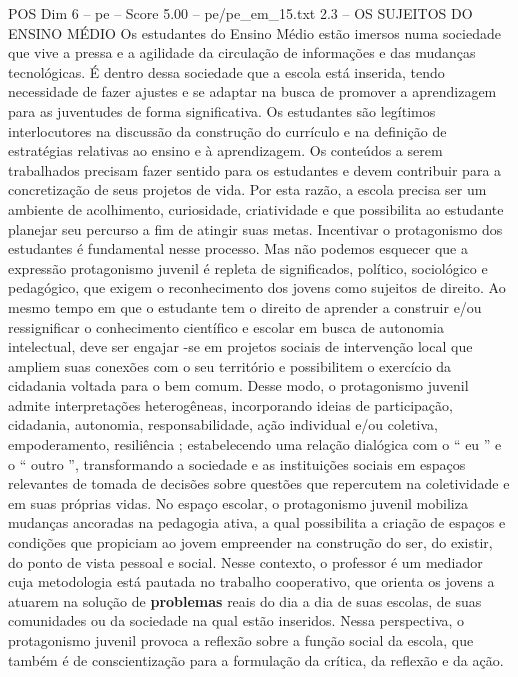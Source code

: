 \begin{textsample}{POS Dim 6 – pe – Score 5.00 – pe/pe\_em\_15.txt}  \label{ex:f6_pos_260}
2.3 – OS SUJEITOS DO ENSINO MÉDIO Os estudantes do Ensino Médio estão imersos numa sociedade que vive a pressa e a agilidade da circulação de informações e das mudanças tecnológicas.
É dentro dessa sociedade que a escola está inserida, tendo necessidade de fazer ajustes e se adaptar na busca de promover a aprendizagem para as juventudes de forma significativa.
Os estudantes são legítimos interlocutores na discussão da construção do currículo e na definição de estratégias relativas ao ensino e à aprendizagem.
Os conteúdos a serem trabalhados precisam fazer sentido para os estudantes e devem contribuir para a concretização de seus projetos de vida.
Por esta razão, a escola precisa ser um ambiente de acolhimento, curiosidade, criatividade e que possibilita ao estudante planejar seu percurso a fim de atingir suas metas.
Incentivar o protagonismo dos estudantes é fundamental nesse processo.
Mas não podemos esquecer que a expressão protagonismo juvenil é repleta de significados, político, sociológico e pedagógico, que exigem o reconhecimento dos jovens como sujeitos de direito.
Ao mesmo tempo em que o estudante tem o direito de aprender a construir e/ou ressignificar o conhecimento científico e escolar em busca de autonomia intelectual, deve ser engajar -se em projetos sociais de intervenção local que ampliem suas conexões com o seu território e possibilitem o exercício da cidadania voltada para o bem comum.
Desse modo, o protagonismo juvenil admite interpretações heterogêneas, incorporando ideias de participação, cidadania, autonomia, responsabilidade, ação individual e/ou coletiva, empoderamento, resiliência ; estabelecendo uma relação dialógica com o “ eu ” e o “ outro ”, transformando a sociedade e as instituições sociais em espaços relevantes de tomada de decisões sobre questões que repercutem na coletividade e em suas próprias vidas.
No espaço escolar, o protagonismo juvenil mobiliza mudanças ancoradas na pedagogia ativa, a qual possibilita a criação de espaços e condições que propiciam ao jovem empreender na construção do ser, do existir, do ponto de vista pessoal e social.
Nesse contexto, o professor é um mediador cuja metodologia está pautada no trabalho cooperativo, que orienta os jovens a atuarem na solução de \textbf{problemas} reais do dia a dia de suas escolas, de suas comunidades ou da sociedade na qual estão inseridos.
Nessa perspectiva, o protagonismo juvenil provoca a reflexão sobre a função social da escola, que também é de conscientização para a formulação da crítica, da reflexão e da ação.

\end{textsample}
